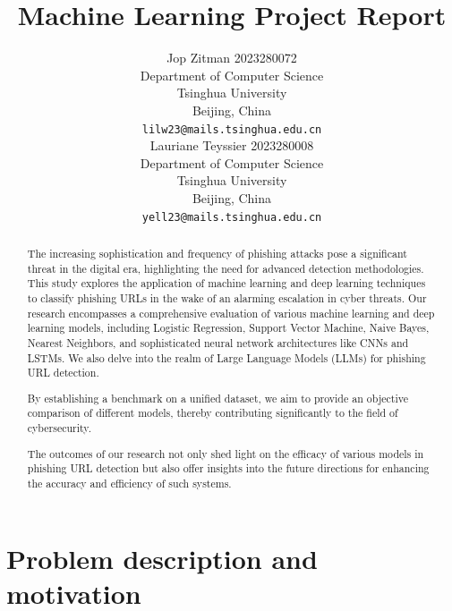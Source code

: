 \documentclass{article}
\title{Machine Learning Project Report}
\author{
    Jop Zitman 2023280072\\
    Department of Computer Science\\
    Tsinghua University\\
    Beijing, China \\
    \texttt{lilw23@mails.tsinghua.edu.cn} \\
    \And
    Lauriane Teyssier 2023280008\\
    Department of Computer Science\\
    Tsinghua University\\
    Beijing, China \\
    \texttt{yell23@mails.tsinghua.edu.cn} \\
}
\begin{document}
    \maketitle

    \begin{abstract}
        The increasing sophistication and frequency of phishing attacks pose a significant threat in the digital era, highlighting the need for advanced detection methodologies.
        This study explores the application of machine learning and deep learning techniques to classify phishing URLs in the wake of an alarming escalation in cyber threats.
        Our research encompasses a comprehensive evaluation of various machine learning and deep learning models, including Logistic Regression, Support Vector Machine, Naive Bayes, Nearest Neighbors, and sophisticated neural network architectures like CNNs and LSTMs. We also delve into the realm of Large Language Models (LLMs) for phishing URL detection.

        By establishing a benchmark on a unified dataset, we aim to provide an objective comparison of different models, thereby contributing significantly to the field of cybersecurity.

        The outcomes of our research not only shed light on the efficacy of various models in phishing URL detection but also offer insights into the future directions for enhancing the accuracy and efficiency of such systems.
    \end{abstract}

    \newpage
    \tableofcontents
    \newpage


%


    \section{Problem description and motivation}\label{sec:problem-description-and-motivation}
\end{document}
